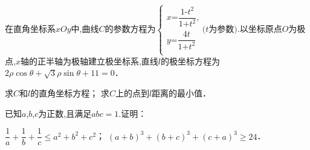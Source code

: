 \documentclass[a4paper]{BHCexam}
\begin{document}
\begin{groups}
\begin{questions}[t]
\begin{minipage}{\textwidth}
\begin{solution}{8cm}
\end{solution}
\end{minipage}
\begin{minipage}{\textwidth}
\question[10] 在直角坐标系$xOy$中,曲线$C$的参数方程为$\left\{ \begin{matrix} x\text{=}\dfrac{1\text{-}t^{2}}{1\text{+}t^{2}}\text{,} \\ y\text{=}\dfrac{4t}{1\text{+}t^{2}} \\ \end{matrix} \right. (t$为参数$).$以坐标原点$O$为极点,$x$轴的正半轴为极轴建立极坐标系,直线$l$的极坐标方程为$2 \rho \cos \theta + \sqrt{3}  \rho \sin \theta +11=0$．
\begin{subquestions}
    \subquestion 求$C$和$l$的直角坐标方程； 
    \subquestion 求$C$上的点到$l$距离的最小值．
\end{subquestions}
\begin{solution}{8cm}

\end{solution}
\end{minipage}
\begin{minipage}{\textwidth}
\question[12] 已知$a$,$b$,$c$为正数,且满足$abc=1.$证明： 
\begin{subquestions}
    \subquestion $\dfrac{1}{a} + \dfrac{1}{b} + \dfrac{1}{c} \leqslant a ^{2} +b ^{2} +c ^{2}$； 
    \subquestion $(a+b) ^{3} +(b+c) ^{3} +(c+a) ^{3} \geqslant 24$．
\end{subquestions}
\begin{solution}{8cm}

\end{solution}
\end{minipage}
\end{questions}
\end{groups}
\label{lastpage}
\end{document}
